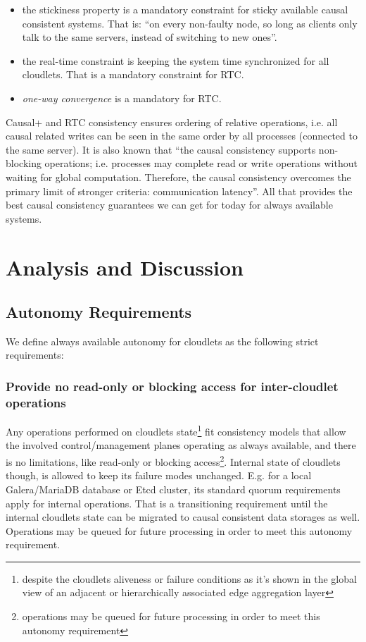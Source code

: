 \documentclass[conference]{IEEEtran}
\begin{document}
\begin{itemize}
  \item the stickiness property is a mandatory constraint for sticky available
    causal consistent systems. That is: ``on every non-faulty node, so long
    as clients only talk to the same servers, instead of switching to new
    ones''\cite{b4}.

  \item the real-time constraint is keeping the system time synchronized for
    all cloudlets. That is a mandatory constraint for RTC.

  \item \textit{one-way convergence}\cite{b2} is a mandatory for RTC.
\end{itemize}

Causal+ and RTC consistency ensures ordering of relative operations, i.e. all
causal related writes can be seen in the same order by all processes
(connected to the same server). It is also known that ``the causal consistency
supports non-blocking operations; i.e. processes may complete read or write
operations without waiting for global computation. Therefore, the causal
consistency overcomes the primary limit of stronger criteria: communication
latency''\cite{b6}. All that provides the best causal consistency guarantees we
can get for today for always available systems.

\section{Analysis and Discussion}

\subsection{Autonomy Requirements}

We define always available autonomy for cloudlets as the following strict
requirements:

\subsubsection{Provide no read-only or blocking access for inter-cloudlet
operations}

Any operations performed on cloudlets state\footnote{despite the cloudlets
aliveness or failure conditions as it's shown in the global view of an adjacent
or hierarchically associated edge aggregation layer} fit consistency models
that allow the involved control/management planes operating as always
available, and there is no limitations, like read-only or blocking
access\footnote{operations may be queued for future processing in order to meet
this autonomy requirement}. Internal state of cloudlets though, is allowed to
keep its failure modes unchanged. E.g. for a local Galera/MariaDB database or
Etcd cluster, its standard quorum requirements apply for internal operations.
That is a transitioning requirement until the internal cloudlets state can be
migrated to causal consistent data storages as well. Operations may be queued
for future processing in order to meet this autonomy requirement.
\end{document}
